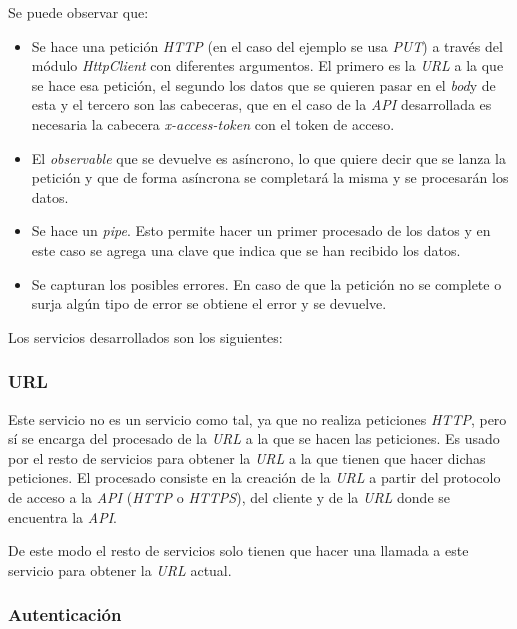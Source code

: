 \bigskip
Se puede observar que:
\begin{itemize}
	\item Se hace una petición \textit{HTTP} (en el caso del ejemplo se usa \textit{PUT}) a través del módulo \textit{HttpClient} con diferentes argumentos. El primero es la \textit{URL} a la que se hace esa petición, el segundo los datos que se quieren pasar en el \textit{bod}y de esta y el tercero son las cabeceras, que en el caso de la \textit{API} desarrollada es necesaria la cabecera \textit{x-access-token} con el token de acceso.
	\item El \textit{observable} que se devuelve es asíncrono, lo que quiere decir que se lanza la petición y que de forma asíncrona se completará la misma y se procesarán los datos.
	\item Se hace un \textit{pipe}. Esto permite hacer un primer procesado de los datos y en este caso se agrega una clave que indica que se han recibido los datos.
	\item Se capturan los posibles errores. En caso de que la petición no se complete o surja algún tipo de error se obtiene el error y se devuelve.
\end{itemize}


\bigskip
Los servicios desarrollados son los siguientes:

\subsubsection{URL}

Este servicio no es un servicio como tal, ya que no realiza peticiones \textit{HTTP}, pero sí se encarga del procesado  de la \textit{URL} a la que se hacen las peticiones. Es usado por el resto de servicios para obtener la \textit{URL} a la que tienen que hacer dichas peticiones. El procesado consiste en la creación de la \textit{URL} a partir del protocolo de acceso a la \textit{API} (\textit{HTTP} o \textit{HTTPS}), del cliente y de la \textit{URL} donde se encuentra la \textit{API}.

De este modo el resto de servicios solo tienen que hacer una llamada a este servicio para obtener la \textit{URL} actual.


\subsubsection{Autenticación}


